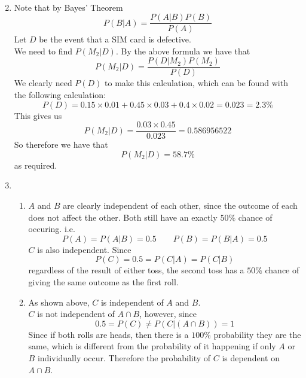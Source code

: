 \documentclass{article}
\theoremstyle{definition}
\theoremstyle{remark}
\theoremstyle{example}
\begin{document}
\begin{enumerate}
\begin{enumerate}
\begin{align*}
			\end{align*}
		\end{enumerate}
		\pagebreak
		\setcounter{enumi}{3}
		\item Note that by Bayes' Theorem \[P(B|A) = \frac{P(A|B)P(B)}{P(A)} \]
		Let $D$ be the event that a SIM card is defective.\\
		We need to find $P(M_2|D)$.
		By the above formula we have that \[P(M_2|D) = \frac{P(D|M_2)P(M_2)}{P(D)}\]
		We clearly need $P(D)$ to make this calculation, which can be found with the following calculation: \[ P(D) = 0.15 \times 0.01+0.45 \times 0.03+0.4 \times 0.02 =  0.023 = 2.3\% \]
		This gives us \[P(M_2|D) = \frac{0.03 \times 0.45}{0.023} = 0.586956522 \]
		So therefore we have that \[P(M_2|D) = 58.7\% \] as required.
		\item \begin{enumerate}
			\item $A$ and $B$ are clearly independent of each other, since the outcome of each does not affect the other. Both still have an exactly $50\%$ chance of occuring.
			i.e. \[ P(A)=P(A|B)=0.5 \qquad P(B)=P(B|A)=0.5 \]
			$C$ is also independent. Since \[ P(C)=0.5=P(C|A)=P(C|B) \]  regardless of the result of either toss, the second toss has a $50\%$ chance of giving the same outcome as the first roll.
			\item As shown above, $C$ is independent of $A$ and $B$.\\
			$C$ is not independent of $A \cap B$, however, since \[0.5=P(C) \neq P(C|(A \cap B))=1\]
			Since if both rolls are heads, then there is a $100\%$ probability they are the same, which is different from the probability of it happening if only $A$ or $B$ individually occur. Therefore the probability of $C$ is dependent on $A \cap B$.
			
		\end{enumerate}
	\end{enumerate}

	
	
\end{document}
